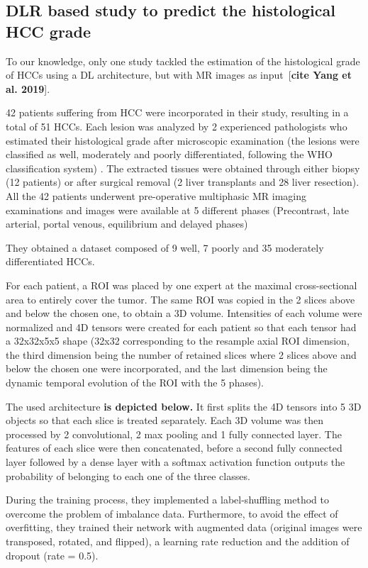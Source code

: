 \documentclass[]{article}
\begin{document}
\subsection{DLR based study to predict the histological HCC
grade}\label{dlr-based-study-to-predict-the-histological-hcc-grade}

To our knowledge, only one study tackled the estimation of the
histological grade of HCCs using a DL architecture, but with MR images
as input~{[}\textbf{cite Yang et al. 2019}{]}.

42 patients suffering from HCC were incorporated in their study,
resulting in a total of 51 HCCs. Each lesion was analyzed by 2
experienced pathologists who estimated their histological grade after
microscopic examination (the lesions were classified as well, moderately
and poorly differentiated, following the WHO classification system) .
The extracted tissues were obtained through either biopsy (12 patients)
or after surgical removal (2 liver transplants and 28 liver resection).
All the 42 patients underwent pre-operative multiphasic MR imaging
examinations and images were available at 5 different phases
(Precontrast, late arterial, portal venous, equilibrium and delayed
phases)

They obtained a dataset composed of 9 well, 7 poorly and 35 moderately
differentiated HCCs.

For each patient, a ROI was placed by one expert at the maximal
cross-sectional area to entirely cover the tumor. The same ROI was
copied in the 2 slices above and below the chosen one, to obtain a 3D
volume. Intensities of each volume were normalized and 4D tensors were
created for each patient so that each tensor had a 32x32x5x5 shape
(32x32 corresponding to the resample axial ROI dimension, the third
dimension being the number of retained slices where 2 slices above and
below the chosen one were incorporated, and the last dimension being the
dynamic temporal evolution of the ROI with the 5 phases).

The used architecture \textbf{is depicted below.} It first splits the 4D
tensors into 5 3D objects so that each slice is treated separately. Each
3D volume was then processed by 2 convolutional, 2 max pooling and 1
fully connected layer. The features of each slice were then
concatenated, before a second fully connected layer followed by a dense
layer with a softmax activation function outputs the probability of
belonging to each one of the three classes.

During the training process, they implemented a label-shuffling method
to overcome the problem of imbalance data. Furthermore, to avoid the
effect of overfitting, they trained their network with augmented data
(original images were transposed, rotated, and flipped), a learning rate
reduction and the addition of dropout (rate = 0.5).
\end{document}
